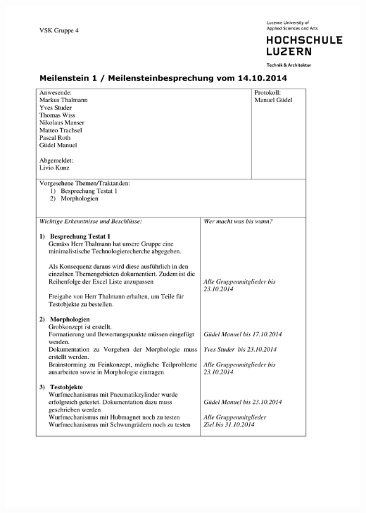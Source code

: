 \begin{appendix}
	            \includegraphics[page=1,width=\textwidth]{Enddokumentation/Anhang/Extern/Besprechung_MS1.pdf}
	            \newpage

\end{appendix}
